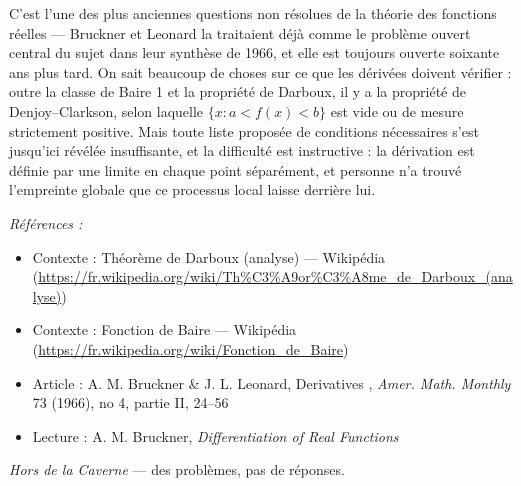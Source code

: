 \documentclass[11pt]{article}
\newenvironment{refs}{\par\small\noindent\emph{Références :}\begin{itemize}\setlength\itemsep{0pt}}{\end{itemize}\normalsize}
\begin{document}
\noindent C'est l'une des plus anciennes questions non résolues de la théorie des fonctions
réelles --- Bruckner et Leonard la traitaient déjà comme le problème ouvert central du sujet dans leur
synthèse de 1966, et elle est toujours ouverte soixante ans plus tard. On sait beaucoup de choses sur
ce que les dérivées doivent vérifier : outre la classe de Baire 1 et la propriété de Darboux, il y a
la propriété de Denjoy--Clarkson, selon laquelle $ \{ x : a < f(x) < b \} $ est vide ou
de mesure strictement positive. Mais toute liste proposée de conditions nécessaires s'est jusqu'ici
révélée insuffisante, et la difficulté est instructive : la dérivation est définie par une limite en
chaque point séparément, et personne n'a trouvé l'empreinte globale que ce processus local laisse
derrière lui.

\begin{refs}
\item Contexte : Théorème de Darboux (analyse) --- Wikipédia (\url{https://fr.wikipedia.org/wiki/Th%C3%A9or%C3%A8me_de_Darboux_(analyse)})
\item Contexte : Fonction de Baire --- Wikipédia (\url{https://fr.wikipedia.org/wiki/Fonction_de_Baire})
\item Article : A. M. Bruckner \& J. L. Leonard, \og{} Derivatives \fg{}, \textit{Amer. Math. Monthly} 73 (1966), no 4, partie II, 24--56
\item Lecture : A. M. Bruckner, \textit{Differentiation of Real Functions}
\end{refs}

\bigskip


\vfill
\noindent\emph{Hors de la Caverne} --- des probl\`emes, pas de r\'eponses.
\end{document}
